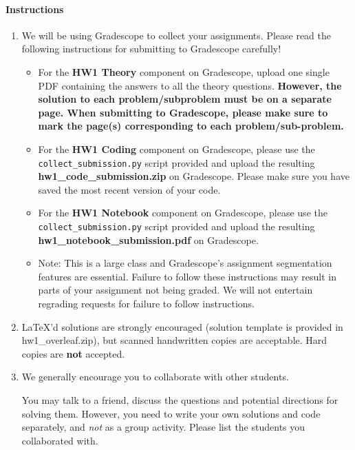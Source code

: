 \documentclass[11pt,english]{article}
\begin{document}
\paragraph*{Instructions}
\begin{enumerate}
\item We will be using Gradescope to collect your assignments. Please read the following instructions for submitting to Gradescope carefully!
     \begin{itemize}
          \item
               For the \textbf{HW1 Theory} component on Gradescope, upload one single PDF containing the answers to all the theory questions. \textbf{However, the solution to each problem/subproblem must be on a separate page. When submitting to Gradescope, please make sure to mark the page(s) corresponding to each problem/sub-problem.}
          \item
               For the \textbf{HW1 Coding} component on Gradescope, please use the \texttt{collect\_submission.py} script provided and upload the resulting \textbf{hw1\_code\_submission.zip} on Gradescope. Please make sure you have saved the most recent version of your code.
          \item
               For the \textbf{HW1 Notebook} component on Gradescope, please use the \texttt{collect\_submission.py} script provided and upload the resulting \textbf{hw1\_notebook\_submission.pdf} on Gradescope.
          \item
               Note: This is a large class and Gradescope's assignment segmentation features are essential.
               Failure to follow these instructions may result in parts of your assignment not being graded.
               We will not entertain regrading requests for failure to follow instructions.
     \end{itemize}

\item
     \LaTeX'd solutions are strongly encouraged (solution template is provided in hw1\_overleaf.zip), but scanned handwritten copies are acceptable. Hard copies are \textbf{not} accepted.


\item We generally encourage you to collaborate with other students.

You may talk to a friend,
discuss the questions and potential directions for solving them. However, you need to write
your own solutions and code separately, and \emph{not} as a group activity.
Please list the students you collaborated with. \\ \\

\end{enumerate}
\newpage
\end{document}
